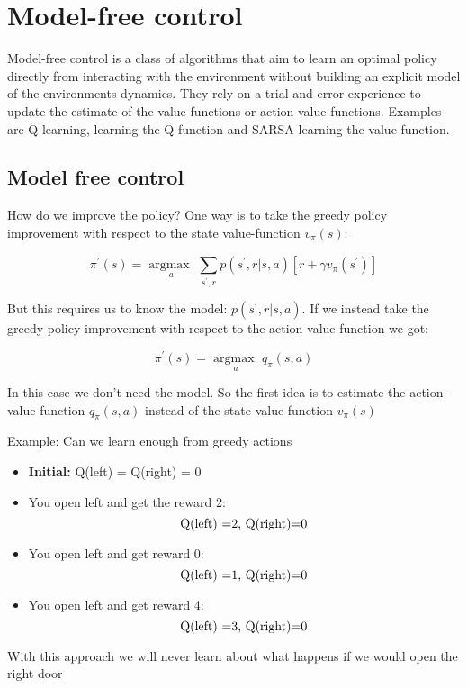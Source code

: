 
\section{Model-free control}
Model-free control is a class of algorithms that aim to learn an optimal policy directly from interacting with the environment without building an explicit model of the environments dynamics. They rely on a trial and error experience to update the estimate of the value-functions or action-value functions. Examples are Q-learning, learning the Q-function and SARSA learning the value-function. 

\subsection{Model free control}
How do we improve the policy? One way is to take the greedy policy improvement with respect to the state value-function $v_\pi(s)$:
	
	\begin{equation}
		\pi^{\prime}(s) = \underset{a}{\arg \text{max }} \sum_{s^{\prime}, r}^{}p(s^{\prime},r |s,a)[r+\gamma v_\pi(s^{\prime})]
	\end{equation}

But this requires us to know the model: $p(s^{\prime},r|s,a)$. If we instead take the greedy policy improvement with respect to the action value function we got:

	\begin{equation}
		\pi^{\prime}(s) = \underset{a}{\arg \text{max }} q_\pi(s,a) 
	\end{equation}

In this case we don't need the model. So the first idea is to estimate the action-value function $q_\pi(s,a)$ instead of the state value-function $v_\pi(s)$

\begin{example}{Example: Can we learn enough from greedy actions}
\begin{itemize}
	\item \textbf{Initial: } Q(left) = Q(right) = 0
	\item You open left and get the reward 2:
		\begin{equation*}
			\text{Q(left) =2, \text{Q(right)=0}}
		\end{equation*}
	\item You open left and get reward 0:
		\begin{equation*}
			\text{Q(left) =1, \text{Q(right)=0}}
		\end{equation*}
	\item You open left and get reward 4:
		\begin{equation*}
			\text{Q(left) =3, \text{Q(right)=0}}
		\end{equation*}
\end{itemize}

With this approach we will never learn about what happens if we would open the right door
\end{example}	

